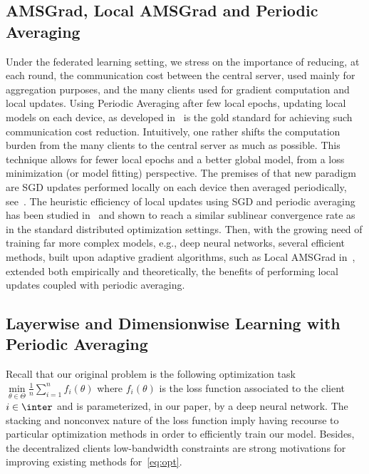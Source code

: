 \documentclass[twoside]{article}
\begin{document}
\subsection{AMSGrad, Local AMSGrad and Periodic Averaging}
Under the federated learning setting, we stress on the importance of reducing, at each round, the communication cost between the central server, used mainly for aggregation purposes, and the many clients used for gradient computation and local updates.
Using Periodic Averaging after few local epochs, updating local models on each device, as developed in~\citet{mcmahan2017communication} is the gold standard for achieving such communication cost reduction.
Intuitively, one rather shifts the computation burden from the many clients to the central server as much as possible. 
This technique allows for fewer local epochs and a better global model, from a loss minimization (or model fitting) perspective.
The premises of that new paradigm are SGD updates performed locally on each device then averaged periodically, see~\citet{konevcny2016federated, zhou2017convergence}.
The heuristic efficiency of local updates using SGD and periodic averaging has been studied in~\citet{stich2018local,yu2019linear} and shown to reach a similar sublinear convergence rate as in the standard distributed optimization settings.
Then, with the growing need of training far more complex models, e.g., deep neural networks, several efficient methods, built upon adaptive gradient algorithms, such as Local AMSGrad in~\citet{chen2020toward}, extended both empirically and theoretically, the benefits of performing local updates coupled with periodic averaging.



\subsection{Layerwise and Dimensionwise Learning with Periodic Averaging}

Recall that our original problem is the following optimization task $\min \limits_{\theta \in \Theta} \frac{1}{n} \sum_{i=1}^n f_i(\theta)$ where $f_i(\theta)$ is the loss function associated to the client $i \in \inter$ and is parameterized, in our paper, by a deep neural network.
The stacking and nonconvex nature of the loss function imply having recourse to particular optimization methods in order to efficiently train our model.
Besides, the decentralized clients low-bandwidth constraints are strong motivations for improving existing methods for~\eqref{eq:opt}.  
\end{document}
